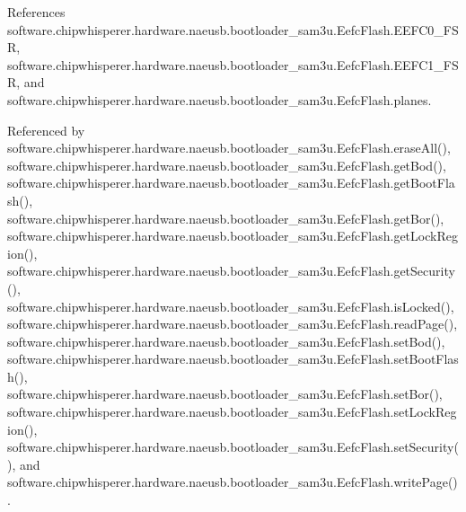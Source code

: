 References software.\+chipwhisperer.\+hardware.\+naeusb.\+bootloader\+\_\+sam3u.\+Eefc\+Flash.\+E\+E\+F\+C0\+\_\+\+F\+S\+R, software.\+chipwhisperer.\+hardware.\+naeusb.\+bootloader\+\_\+sam3u.\+Eefc\+Flash.\+E\+E\+F\+C1\+\_\+\+F\+S\+R, and software.\+chipwhisperer.\+hardware.\+naeusb.\+bootloader\+\_\+sam3u.\+Eefc\+Flash.\+planes.



Referenced by software.\+chipwhisperer.\+hardware.\+naeusb.\+bootloader\+\_\+sam3u.\+Eefc\+Flash.\+erase\+All(), software.\+chipwhisperer.\+hardware.\+naeusb.\+bootloader\+\_\+sam3u.\+Eefc\+Flash.\+get\+Bod(), software.\+chipwhisperer.\+hardware.\+naeusb.\+bootloader\+\_\+sam3u.\+Eefc\+Flash.\+get\+Boot\+Flash(), software.\+chipwhisperer.\+hardware.\+naeusb.\+bootloader\+\_\+sam3u.\+Eefc\+Flash.\+get\+Bor(), software.\+chipwhisperer.\+hardware.\+naeusb.\+bootloader\+\_\+sam3u.\+Eefc\+Flash.\+get\+Lock\+Region(), software.\+chipwhisperer.\+hardware.\+naeusb.\+bootloader\+\_\+sam3u.\+Eefc\+Flash.\+get\+Security(), software.\+chipwhisperer.\+hardware.\+naeusb.\+bootloader\+\_\+sam3u.\+Eefc\+Flash.\+is\+Locked(), software.\+chipwhisperer.\+hardware.\+naeusb.\+bootloader\+\_\+sam3u.\+Eefc\+Flash.\+read\+Page(), software.\+chipwhisperer.\+hardware.\+naeusb.\+bootloader\+\_\+sam3u.\+Eefc\+Flash.\+set\+Bod(), software.\+chipwhisperer.\+hardware.\+naeusb.\+bootloader\+\_\+sam3u.\+Eefc\+Flash.\+set\+Boot\+Flash(), software.\+chipwhisperer.\+hardware.\+naeusb.\+bootloader\+\_\+sam3u.\+Eefc\+Flash.\+set\+Bor(), software.\+chipwhisperer.\+hardware.\+naeusb.\+bootloader\+\_\+sam3u.\+Eefc\+Flash.\+set\+Lock\+Region(), software.\+chipwhisperer.\+hardware.\+naeusb.\+bootloader\+\_\+sam3u.\+Eefc\+Flash.\+set\+Security(), and software.\+chipwhisperer.\+hardware.\+naeusb.\+bootloader\+\_\+sam3u.\+Eefc\+Flash.\+write\+Page().


